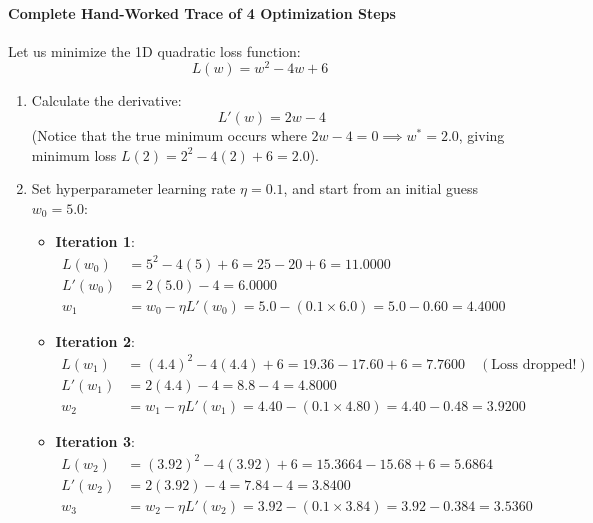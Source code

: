\paragraph{Complete Hand-Worked Trace of 4 Optimization Steps}
Let us minimize the 1D quadratic loss function:
\begin{equation*}
L(w) = w^2 - 4w + 6
\end{equation*}
\begin{enumerate}
    \item Calculate the derivative:
    \begin{equation*}
    L'(w) = 2w - 4
    \end{equation*}
    (Notice that the true minimum occurs where $2w - 4 = 0 \implies w^* = 2.0$, giving minimum loss $L(2) = 2^2 - 4(2) + 6 = 2.0$).

    \item Set hyperparameter learning rate $\eta = 0.1$, and start from an initial guess $w_0 = 5.0$:
    \begin{itemize}
        \item \textbf{Iteration 1}:
        \begin{align*}
        L(w_0) &= 5^2 - 4(5) + 6 = 25 - 20 + 6 = \mathbf{11.0000} \\
        L'(w_0) &= 2(5.0) - 4 = \mathbf{6.0000} \\
        w_1 &= w_0 - \eta L'(w_0) = 5.0 - (0.1 \times 6.0) = 5.0 - 0.60 = \mathbf{4.4000}
        \end{align*}

        \item \textbf{Iteration 2}:
        \begin{align*}
        L(w_1) &= (4.4)^2 - 4(4.4) + 6 = 19.36 - 17.60 + 6 = \mathbf{7.7600} \quad (\text{Loss dropped!}) \\
        L'(w_1) &= 2(4.4) - 4 = 8.8 - 4 = \mathbf{4.8000} \\
        w_2 &= w_1 - \eta L'(w_1) = 4.40 - (0.1 \times 4.80) = 4.40 - 0.48 = \mathbf{3.9200}
        \end{align*}

        \item \textbf{Iteration 3}:
        \begin{align*}
        L(w_2) &= (3.92)^2 - 4(3.92) + 6 = 15.3664 - 15.68 + 6 = \mathbf{5.6864} \\
        L'(w_2) &= 2(3.92) - 4 = 7.84 - 4 = \mathbf{3.8400} \\
        w_3 &= w_2 - \eta L'(w_2) = 3.92 - (0.1 \times 3.84) = 3.92 - 0.384 = \mathbf{3.5360}
        \end{align*}


\end{itemize}
\end{enumerate}
